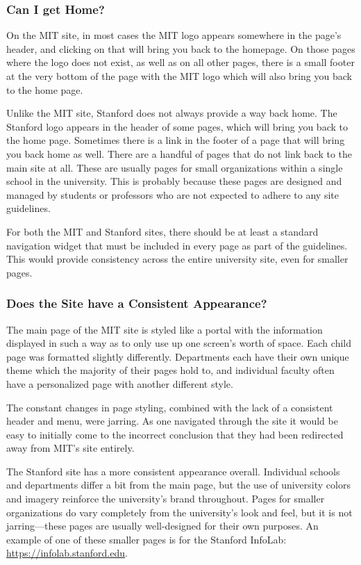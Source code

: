 \subsubsection*{Can I get Home?}

On the MIT site, in most cases the MIT logo appears somewhere in the page's header, and clicking on that
will bring you back to the homepage. On those pages where the logo does not exist, as well as
on all other pages, there is a small footer at the very bottom of the page with the MIT logo
which will also bring you back to the home page.

Unlike the MIT site, Stanford does not always provide a way back home. The Stanford
logo appears in the header of some pages, which will bring you back to the home
page. Sometimes there is a link in the footer of a page that will bring you back
home as well. There are a handful of pages that do not link back to the main
site at all. These are usually pages for small organizations within a single
school in the university. This is probably because these pages are designed and
managed by students or professors who are not expected to adhere to any site
guidelines.

For both the MIT and Stanford sites, there should be at least a standard navigation
widget that must be included in every page as part of the guidelines. This would
provide consistency across the entire university site, even for smaller pages.

\subsubsection*{Does the Site have a Consistent Appearance?}

The main page of the MIT site is styled like a portal with the information displayed in such a way as to
only use up one screen's worth of space. Each child page was formatted slightly differently.
Departments each have their own unique theme which the majority of their pages hold to, and
individual faculty often have a personalized page with another different style.

The constant changes in page styling, combined with the lack of a consistent header and
menu, were jarring. As one navigated through the site it would be easy to initially
come to the incorrect conclusion that they had been redirected away from MIT's site entirely.

The Stanford site has a more consistent appearance overall. Individual schools and
departments differ a bit from the main page, but the use of university colors and imagery
reinforce the university's brand throughout. Pages for smaller organizations do
vary completely from the university's look and feel, but it is not jarring---these
pages are usually well-designed for their own purposes. An example of one of these
smaller pages is for the Stanford InfoLab: \url{https://infolab.stanford.edu}.

